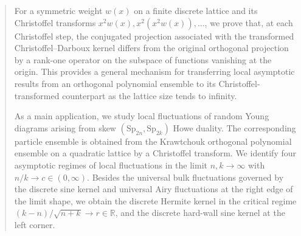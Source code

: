\documentclass[reqno,11pt]{amsart}
\newcommand{\RR}{\mathbb{R}}
\theoremstyle{plain}
\theoremstyle{definition}
\numberwithin{equation}{section}
\begin{document}
   \author[A.~Selemenchuk]{Anton Selemenchuk}
  \address[A.~Selemenchuk] {Faculty of Mathematics and Computer Science,
    St.\ Petersburg State University, University Embankment, 7/9, St.\
    Petersburg, Russia, 199034}
\begin{abstract}  
For a symmetric weight $w(x)$ on a finite discrete lattice and its Christoffel transforms $x^{2}w(x),x^{2}(x^{2}w(x)),\dots$, we prove that, at each Christoffel step, the conjugated projection associated with the transformed Christoffel--Darboux kernel differs from the original orthogonal projection by a rank-one operator on the subspace of functions vanishing at the origin. This provides a general mechanism for transferring local asymptotic results from an orthogonal polynomial ensemble to its Christoffel-transformed counterpart as the lattice size tends to infinity.

As a main application, we study local fluctuations of random Young diagrams arising from skew $(\mathrm{Sp}_{2n},\mathrm{Sp}_{2k})$ Howe duality. The corresponding particle ensemble is obtained from the Krawtchouk orthogonal polynomial ensemble on a quadratic lattice by a Christoffel transform. We identify four asymptotic regimes of local fluctuations in the limit $n,k\to\infty$ with $n/k\to c\in(0,\infty)$. Besides the universal bulk fluctuations governed by the discrete sine kernel and universal Airy fluctuations at the right edge of the limit shape, we obtain the discrete Hermite kernel in the critical regime
$(k-n)/\sqrt{n+k}\longrightarrow r\in\RR$, and the discrete hard-wall sine kernel at the left corner.
\end{abstract}

\maketitle

\tableofcontents
\end{document}

